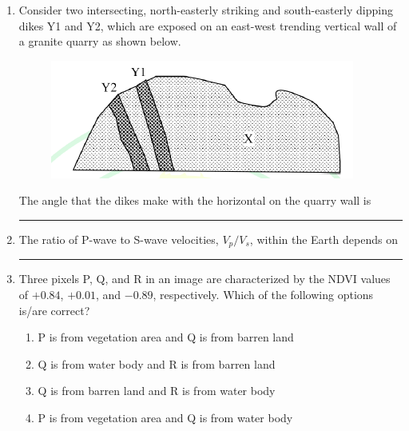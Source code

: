 \documentclass[journal,12pt,onecolumn]{IEEEtran}
\theoremstyle{remark}
\begin{document}
\begin{enumerate}
\item Consider two intersecting, north-easterly striking and south-easterly dipping dikes Y1 and Y2, which are exposed on an east-west trending vertical wall of a granite  quarry as shown below.
\begin{figure}[H]
    \centering
    \includegraphics[width=0.5\columnwidth]{figs/fig4.png}
    \caption{}
    \label{fig:q19}
\end{figure}
The angle that the dikes make with the horizontal on the quarry wall is \rule{3cm}{0.15mm} \hfill{}
\begin{enumerate}
\end{enumerate}

\item The ratio of P-wave to S-wave velocities, $V_p/V_s$, within the Earth depends on \rule{3cm}{0.15mm} \hfill{}
\begin{enumerate}
\end{enumerate}

\item Three pixels P, Q, and R in an image are characterized by the NDVI values of $+0.84$, $+0.01$, and $-0.89$, respectively. Which of the following options is/are correct? \hfill{}
\begin{enumerate}
    \item P is from vegetation area and Q is from barren land
    \item Q is from water body and R is from barren land
    \item Q is from barren land and R is from water body
    \item P is from vegetation area and Q is from water body
\end{enumerate}


\end{enumerate}
\end{document}
